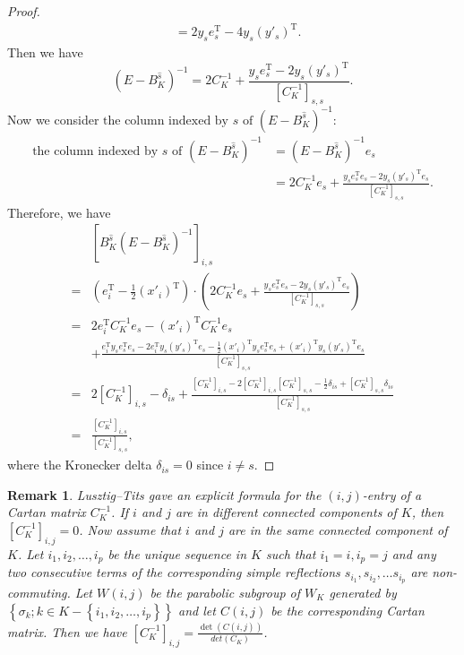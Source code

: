 \documentclass[11pt, letterpaper]{amsart}
\numberwithin{equation}{section}
\newtheorem{remark}[theorem]{Remark}
\begin{document}
\begin{proof}
\begin{align*}
        &= 2y_se_s^{\text{T}} - 4y_s(y'_s)^{\text{T}}.
    \end{align*}
    Then we have 
    \[
    (E - B_K^{\widehat{s}})^{-1} = 2C_K^{-1} + \frac{y_se_s^{\text{T}} - 2y_s(y'_s)^{\text{T}}}{[C_K^{-1}]_{s,s}}.
    \]
    Now we consider \(\text{the column indexed by $s$ of } (E - B_K^{\widehat{s}})^{-1}\):
    \begin{align*}
        \text{the column indexed by $s$ of } (E - B_K^{\widehat{s}})^{-1} 
        &= (E - B_K^{\widehat{s}})^{-1} e_s \\
        &= 2 C_K^{-1} e_s + \frac{y_s e_s^{\text{T}} e_s - 2 y_s (y'_s)^{\text{T}} e_s}{[C_K^{-1}]_{s,s}}.
    \end{align*}
    Therefore, we have
   \begin{align*}
        &\left[ B_K^{\widehat{s}}(E - B_K^{\widehat{s}})^{-1} \right]_{i,s} \\
        =& \left( e_i^{\text{T}} - \frac{1}{2} (x'_i)^{\text{T}} \right) \cdot \left( 2 C_K^{-1} e_s + \frac{y_s e_s^{\text{T}} e_s - 2 y_s (y'_s)^{\text{T}} e_s}{[C_K^{-1}]_{s,s}} \right) \\
        =& 2 e_i^{\text{T}} C_K^{-1} e_s - (x'_i)^{\text{T}} C_K^{-1} e_s \\
        &+ \frac{e_i^{\text{T}} y_s e_s^{\text{T}} e_s - 2 e_i^{\text{T}} y_s (y'_s)^{\text{T}} e_s - \frac{1}{2} (x'_i)^{\text{T}} y_s e_s^{\text{T}} e_s + (x'_i)^{\text{T}} y_s (y'_s)^{\text{T}} e_s}{[C_K^{-1}]_{s,s}} \\
        =& 2[C_K^{-1}]_{i,s} - \delta_{is} + \frac{[C_K^{-1}]_{i,s}-2[C_K^{-1}]_{i,s}[C_K^{-1}]_{s,s} - \frac{1}{2}\delta_{is} + [C_K^{-1}]_{s,s}\delta_{is}}{[C_K^{-1}]_{s,s}} \\
        =& \frac{[C_K^{-1}]_{i,s}}{[C_K^{-1}]_{s,s}},
    \end{align*}
    where the Kronecker delta $\delta_{is}=0$ since $i \neq s$.
\end{proof}

\begin{remark}
    Lusztig--Tits \cite{lusztig1992inverse} gave an explicit formula for the $(i, j)$-entry of a Cartan matrix $C_K^{-1}$. If $i$ and $j$ are in different connected components of $K$, then $[C_K^{-1}]_{i,j}=0$. Now assume that $i$ and $j$ are in the same connected component of $K$. Let $i_1, i_2, \ldots, i_p$ be the unique sequence in $K$ such that $i_1=i, i_p=j$ and any two consecutive terms of the corresponding simple reflections $s_{i_1}, s_{i_2}, \ldots s_{i_p}$ are non-commuting. Let $W(i, j)$ be the parabolic subgroup of $W_K$ generated by $\left\{\sigma_k ; k \in K-\left\{i_1, i_2, \ldots, i_p\right\}\right\}$ and let $C(i, j)$ be the corresponding Cartan matrix. Then we have $[C_K^{-1}]_{i,j}=\frac{\det(C(i, j))}{det(C_K)}$.
\end{remark}
\end{document}
